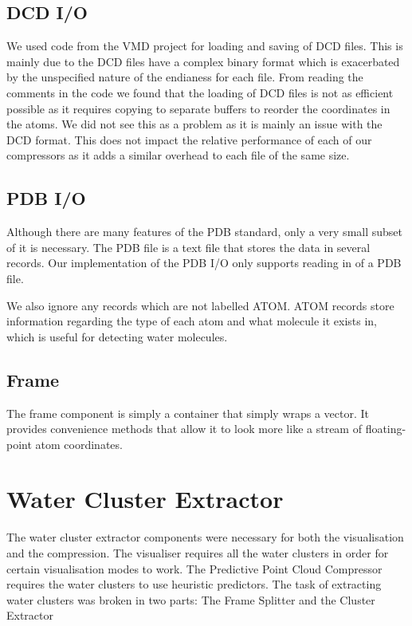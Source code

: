 \documentclass[a4paper,11pt]{report}
\begin{document}
\subsection{DCD I/O}

We used code from the VMD project for loading and saving of DCD files. This is mainly due to the DCD files have a complex binary format which is exacerbated by the unspecified nature of the endianess for each file. From reading the comments in the code we found that the loading of DCD files is not as efficient possible as it requires copying to separate buffers to reorder the coordinates in the atoms. We did not see this as a problem as it is mainly an issue with the DCD format. This does not impact the relative performance of each of our compressors as it adds a similar overhead to each file of the same size.

\subsection{PDB I/O}

Although there are many features of the PDB standard, only a very small subset of it is necessary. The PDB file is a text file that stores the data in several records. Our implementation of the PDB I/O only supports reading in of a PDB file. 

We also ignore any records which are not labelled ATOM. ATOM records store information regarding the type of each atom and what molecule it exists in, which is useful for detecting water molecules.

\subsection{Frame}

The frame component is simply a container that simply wraps a vector. It provides convenience methods that allow it to look more like a stream of floating-point atom coordinates.

\section{Water Cluster Extractor}

The water cluster extractor components were necessary for both the visualisation and the compression. The visualiser requires all the water clusters in order for certain visualisation modes to work. The Predictive Point Cloud Compressor requires the water clusters to use heuristic predictors. The task of extracting water clusters was broken in two parts: The Frame Splitter and the Cluster Extractor
\end{document}

